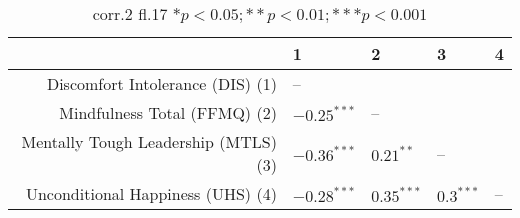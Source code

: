 \begin{table}[ht]
\centering
\begin{tabular}{rllll}
  \hline
 & 1 & 2 & 3 & 4 \\ 
  \hline
Discomfort Intolerance (DIS) (1) & -- &  &  &  \\ 
  Mindfulness Total (FFMQ) (2) & $-0.25^{***}$ & -- &  &  \\ 
  Mentally Tough Leadership (MTLS) (3) & $-0.36^{***}$ & $0.21^{**}$ & -- &  \\ 
  Unconditional Happiness (UHS) (4) & $-0.28^{***}$ & $0.35^{***}$ & $0.3^{***}$ & -- \\ 
   \hline
\end{tabular}
\caption{corr.2 fl.17 $* p < 0.05; ** p < 0.01; *** p < 0.001$} 
\label{freq_corr.corr.2.fl.17}
\end{table}
